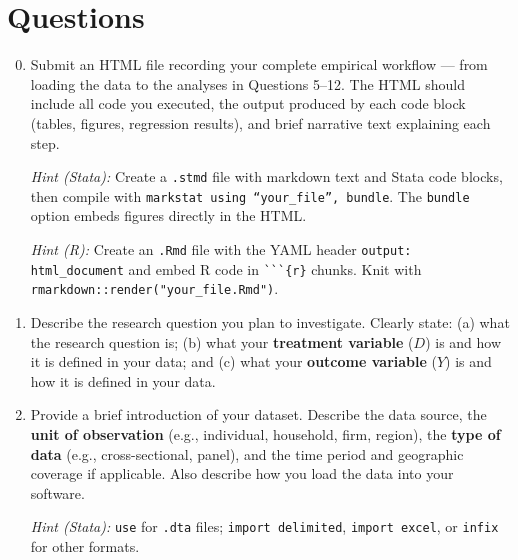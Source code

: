 \documentclass[paper=a4, fontsize=11pt]{scrartcl}
\begin{document}
\vspace{0.3cm}


\section*{Questions}

\begin{enumerate}
\setcounter{enumi}{-1}

\item Submit an HTML file recording your complete empirical workflow --- from loading the data to the analyses in Questions 5--12. The HTML should include all code you executed, the output produced by each code block (tables, figures, regression results), and brief narrative text explaining each step.

\textit{Hint (Stata):} Create a \texttt{.stmd} file with markdown text and Stata code blocks, then compile with \texttt{markstat using ``your\_file'', bundle}. The \texttt{bundle} option embeds figures directly in the HTML.

\textit{Hint (R):} Create an \texttt{.Rmd} file with the YAML header \texttt{output: html\_document} and embed R code in \texttt{\`{}\`{}\`{}\{r\}} chunks. Knit with \texttt{rmarkdown::render("your\_file.Rmd")}.

\vspace{0.3cm}

\item Describe the research question you plan to investigate. Clearly state: (a) what the research question is; (b) what your \textbf{treatment variable} ($D$) is and how it is defined in your data; and (c) what your \textbf{outcome variable} ($Y$) is and how it is defined in your data.

\vspace{0.3cm}

\item Provide a brief introduction of your dataset. Describe the data source, the \textbf{unit of observation} (e.g., individual, household, firm, region), the \textbf{type of data} (e.g., cross-sectional, panel), and the time period and geographic coverage if applicable. Also describe how you load the data into your software.

\textit{Hint (Stata):} \texttt{use} for \texttt{.dta} files; \texttt{import delimited}, \texttt{import excel}, or \texttt{infix} for other formats.


\end{enumerate}
\end{document}
